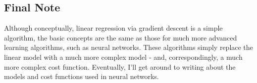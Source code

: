 \documentclass[a4paper]{article}
\begin{document}
\subsection*{Final Note}

Although conceptually, linear regression via gradient descent is a simple algorithm, the basic
concepts are the same as those for much more advanced learning algorithms, such as neural networks.
These algorithms simply replace the linear model with a much more complex model - and,
correspondingly, a much more complex cost function. Eventually, I'll get around to writing about the
models and cost functions used in neural networks.
\end{document}
